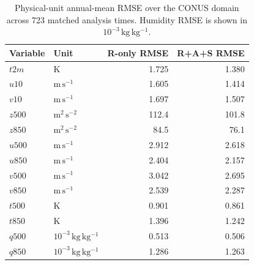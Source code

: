 \begin{table}[!htbp]
    \centering
    \caption{Physical-unit annual-mean RMSE over the CONUS domain across 723
    matched analysis times. Humidity RMSE is shown in
    $10^{-3}\,\mathrm{kg\,kg^{-1}}$.}
    \label{tab:absolute_rmse_conus}
    \small
    \renewcommand{\arraystretch}{1.10}
    \begin{tabular*}{\textwidth}{@{\extracolsep{\fill}}llrr@{}}
        \toprule
        Variable & Unit & R-only RMSE & R+A+S RMSE \\
        \midrule
        $t2m$ & $\mathrm{K}$ & 1.725 & 1.380 \\
        $u10$ & $\mathrm{m\,s^{-1}}$ & 1.605 & 1.414 \\
        $v10$ & $\mathrm{m\,s^{-1}}$ & 1.697 & 1.507 \\
        $z500$ & $\mathrm{m^2\,s^{-2}}$ & 112.4 & 101.8 \\
        $z850$ & $\mathrm{m^2\,s^{-2}}$ & 84.5 & 76.1 \\
        $u500$ & $\mathrm{m\,s^{-1}}$ & 2.912 & 2.618 \\
        $u850$ & $\mathrm{m\,s^{-1}}$ & 2.404 & 2.157 \\
        $v500$ & $\mathrm{m\,s^{-1}}$ & 3.042 & 2.695 \\
        $v850$ & $\mathrm{m\,s^{-1}}$ & 2.539 & 2.287 \\
        $t500$ & $\mathrm{K}$ & 0.901 & 0.861 \\
        $t850$ & $\mathrm{K}$ & 1.396 & 1.242 \\
        $q500$ & $10^{-3}\,\mathrm{kg\,kg^{-1}}$ & 0.513 & 0.506 \\
        $q850$ & $10^{-3}\,\mathrm{kg\,kg^{-1}}$ & 1.286 & 1.263 \\
        \bottomrule
    \end{tabular*}
\end{table}
